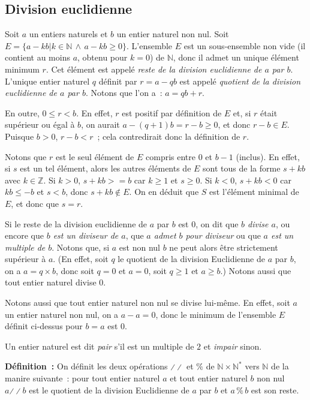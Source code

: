 \subsection{Division euclidienne}

Soit $a$ un entiers naturels et $b$ un entier naturel non nul. 
Soit $E = \lbrace a - k b \vert k \in \mathbb{N} \, \wedge \, a - k b \geq 0 \rbrace$. 
L'ensemble $E$ est un sous-ensemble non vide (il contient au moins $a$, obtenu pour $k=0$) de $\mathbb{N}$, donc il admet un unique élément minimum $r$. 
Cet élément est appelé \textit{reste de la division euclidienne de $a$ par $b$}. 
L'unique entier naturel $q$ définit par $r = a - q b$ est appelé \textit{quotient de la division euclidienne de $a$ par $b$}. 
Notons que l'on a : $a = q b + r$. 

En outre, $0 \leq r < b$. 
En effet, $r$ est positif par définition de $E$ et, si $r$ était supérieur ou égal à $b$, on aurait $a - (q+1)b = r - b \geq 0$, et donc $r - b \in E$. 
Puisque $b > 0$, $r - b < r$ ; cela contredirait donc la définition de $r$. 

Notons que $r$ est le seul élément de $E$ compris entre $0$ et $b-1$ (inclus). 
En effet, si $s$ est un tel élément, alors les autres éléments de $E$ sont tous de la forme $s + k b$ avec $k \in \mathbb{Z}$. 
Si $k > 0$, $s + k b >= b$ car $k \geq 1$ et $s \geq 0$.
Si $k < 0$, $s + k b < 0$ car $k b \leq -b$ et $s < b$, donc $s + k b \notin E$.
On en déduit que $S$ est l'élément minimal de $E$, et donc que $s=r$. 

Si le reste de la division euclidienne de $a$ par $b$ est $0$, on dit que \textit{$b$ divise $a$}, ou encore que \textit{$b$ est un diviseur de $a$}, que \textit{$a$ admet $b$ pour diviseur} ou que \textit{$a$ est un multiple de $b$}. 
Notons que, si $a$ est non nul $b$ ne peut alors être strictement supérieur à $a$. 
(En effet, soit $q$ le quotient de la division Euclidienne de $a$ par $b$, on a $a = q \times b$, donc soit $q = 0$ et $a = 0$, soit $q \geq 1$ et $a \geq b$.)
Notons aussi que tout entier naturel divise $0$.

Notons aussi que tout entier naturel non nul se divise lui-même. 
En effet, soit $a$ un entier naturel non nul, on a $a - a = 0$, donc le minimum de l'ensemble $E$ définit ci-dessus pour $b=a$ est $0$.

Un entier naturel est dit \textit{pair} s'il est un multiple de $2$ et \textit{impair} sinon. 

\bigskip

\noindent\textbf{Définition :} On définit les deux opérations $\divslash\!\divslash$ et $\%$ de $\mathbb{N} \times \mathbb{N}^*$ vers $\mathbb{N}$ de la manire suivante : pour tout entier naturel $a$ et tout entier naturel $b$ non nul $a \mathrel{\divslash\!\divslash} b$ est le quotient de la division Euclidienne de $a$ par $b$ et $a \mathrel{\%} b$ est son reste. 


